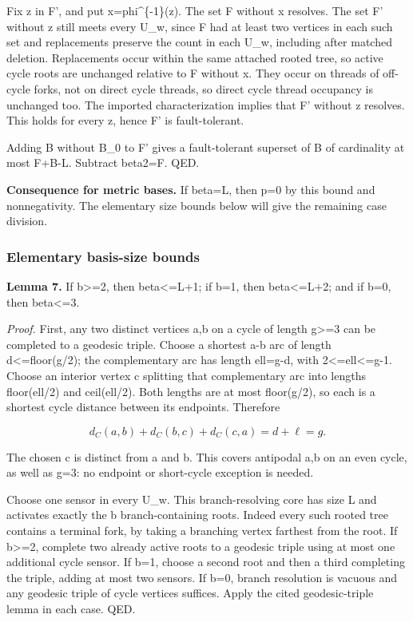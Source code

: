 \documentclass[
]{article}
\begin{document}
Fix z in F', and put x=phi\^{}\{-1\}(z). The set F without x resolves.
The set F' without z still meets every U\_w, since F had at least two
vertices in each such set and replacements preserve the count in each
U\_w, including after matched deletion. Replacements occur within the
same attached rooted tree, so active cycle roots are unchanged relative
to F without x. They occur on threads of off-cycle forks, not on direct
cycle threads, so direct cycle thread occupancy is unchanged too. The
imported characterization implies that F' without z resolves. This holds
for every z, hence F' is fault-tolerant.

Adding B without B\_0 to F' gives a fault-tolerant superset of B of
cardinality at most \textbar F\textbar+\textbar B\textbar-L. Subtract
beta2=\textbar F\textbar. QED.

\textbf{Consequence for metric bases.} If beta=L, then p=0 by this bound
and nonnegativity. The elementary size bounds below will give the
remaining case division.

\subsubsection{Elementary basis-size
bounds}\label{elementary-basis-size-bounds}

\textbf{Lemma 7.} If b\textgreater=2, then beta\textless=L+1; if b=1,
then beta\textless=L+2; and if b=0, then beta\textless=3.

\emph{Proof.} First, any two distinct vertices a,b on a cycle of length
g\textgreater=3 can be completed to a geodesic triple. Choose a shortest
a-b arc of length d\textless=floor(g/2); the complementary arc has
length ell=g-d, with 2\textless=ell\textless=g-1. Choose an interior
vertex c splitting that complementary arc into lengths floor(ell/2) and
ceil(ell/2). Both lengths are at most floor(g/2), so each is a shortest
cycle distance between its endpoints. Therefore

\[d_C(a,b)+d_C(b,c)+d_C(c,a)=d+\ell=g.\]

The chosen c is distinct from a and b. This covers antipodal a,b on an
even cycle, as well as g=3: no endpoint or short-cycle exception is
needed.

Choose one sensor in every U\_w. This branch-resolving core has size L
and activates exactly the b branch-containing roots. Indeed every such
rooted tree contains a terminal fork, by taking a branching vertex
farthest from the root. If b\textgreater=2, complete two already active
roots to a geodesic triple using at most one additional cycle sensor. If
b=1, choose a second root and then a third completing the triple, adding
at most two sensors. If b=0, branch resolution is vacuous and any
geodesic triple of cycle vertices suffices. Apply the cited
geodesic-triple lemma in each case. QED.
\end{document}
